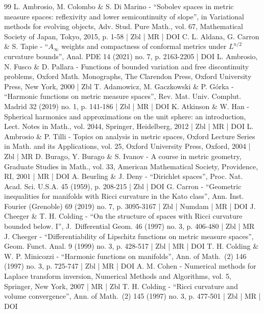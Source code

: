 \documentclass[10pt]{amsart}
\theoremstyle{plain}
\theoremstyle{definition}
\begin{document}
\begin{thebibliography}{99}
L. Ambrosio, M. Colombo \& S. Di Marino - “Sobolev spaces in metric measure spaces: reflexivity and lower semicontinuity of slope”, in Variational methods for evolving objects, Adv. Stud. Pure Math., vol. 67, Mathematical Society of Japan, Tokyo, 2015, p. 1-58 | Zbl | MR | DOI
C. L. Aldana, G. Carron \& S. Tapie - “$A_\infty $ weights and compactness of conformal metrics under $L^{n/2}$ curvature bounds”, Anal. PDE 14 (2021) no. 7, p. 2163-2205 | DOI
L. Ambrosio, N. Fusco \& D. Pallara - Functions of bounded variation and free discontinuity problems, Oxford Math. Monographs, The Clarendon Press, Oxford University Press, New York, 2000 | Zbl
T. Adamowicz, M. Gaczkowski \& P. Górka - “Harmonic functions on metric measure spaces”, Rev. Mat. Univ. Complut. Madrid 32 (2019) no. 1, p. 141-186 | Zbl | MR | DOI
K. Atkinson \& W. Han - Spherical harmonics and approximations on the unit sphere: an introduction, Lect. Notes in Math., vol. 2044, Springer, Heidelberg, 2012 | Zbl | MR | DOI
L. Ambrosio \& P. Tilli - Topics on analysis in metric spaces, Oxford Lecture Series in Math. and its Applications, vol. 25, Oxford University Press, Oxford, 2004 | Zbl | MR
D. Burago, Y. Burago \& S. Ivanov - A course in metric geometry, Graduate Studies in Math., vol. 33, American Mathematical Society, Providence, RI, 2001 | MR | DOI
A. Beurling \& J. Deny - “Dirichlet spaces”, Proc. Nat. Acad. Sci. U.S.A. 45 (1959), p. 208-215 | Zbl | DOI
G. Carron - “Geometric inequalities for manifolds with Ricci curvature in the Kato class”, Ann. Inst. Fourier (Grenoble) 69 (2019) no. 7, p. 3095-3167 | Zbl | Numdam | MR | DOI
J. Cheeger \& T. H. Colding - “On the structure of spaces with Ricci curvature bounded below. I”, J. Differential Geom. 46 (1997) no. 3, p. 406-480 | Zbl | MR
J. Cheeger - “Differentiability of Lipschitz functions on metric measure spaces”, Geom. Funct. Anal. 9 (1999) no. 3, p. 428-517 | Zbl | MR | DOI
T. H. Colding \& W. P. Minicozzi - “Harmonic functions on manifolds”, Ann. of Math. (2) 146 (1997) no. 3, p. 725-747 | Zbl | MR | DOI
A. M. Cohen - Numerical methods for Laplace transform inversion, Numerical Methods and Algorithms, vol. 5, Springer, New York, 2007 | MR | Zbl
T. H. Colding - “Ricci curvature and volume convergence”, Ann. of Math. (2) 145 (1997) no. 3, p. 477-501 | Zbl | MR | DOI

\end{thebibliography}
\end{document}
